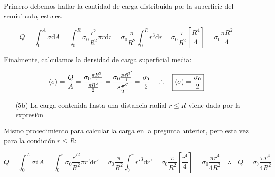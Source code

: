 \documentclass[a4paper,10pt]{article}
\begin{document}
Primero debemos hallar la cantidad de carga distribuida por la superficie del
semic\'irculo, esto es:

\begin{equation*}
    Q=\int_{0}^{A}\sigma\mathrm{d}A=\int_{0}^{R}\sigma_{0}\frac{r^2}{R^2}\pi r\mathrm{d}r
    =\sigma_{0}\frac{\pi}{R^{2}}\int_{0}^{R}r^{3}\mathrm{d}r
    =\sigma_{0}\frac{\pi}{R^{2}}\left[\frac{R^{4}}{4}\right]
    =\sigma_{0}\frac{\pi R^{2}}{4}
\end{equation*}

Finalmente, calculamos la densidad de carga superficial media:

\begin{equation*}
    \langle\sigma\rangle=\frac{Q}{A}
    =\frac{\sigma_{0}\frac{\pi R^{2}}{4}}{\frac{\pi R^{2}}{2}}
    =\frac{\sigma_{0}\frac{\cancel{\pi R^{2}}}{4}}{\frac{\cancel{\pi R^{2}}}{2}}
    =\frac{\sigma_{0}}{2}
    \quad\therefore\quad\boxed{\langle\sigma\rangle=\frac{\sigma_{0}}{2}}
\end{equation*}

\begin{itemize}
    \item[(5b)] La carga contenida hasta una distancia radial $r \leq R$ viene dada por la expresión
\end{itemize}

Mismo procedimiento para calcular la carga en la pregunta anterior, pero esta
vez para la condici\'on $r \leq R$:

\begin{equation*}
    Q=\int_{0}^{A}\sigma\mathrm{d}A=\int_{0}^{r}\sigma_{0}\frac{r'^2}{R^2}\pi r'\mathrm{d}r'
    =\sigma_{0}\frac{\pi}{R^{2}}\int_{0}^{r}r'^{3}\mathrm{d}r'
    =\sigma_{0}\frac{\pi}{R^{2}}\left[\frac{r^{4}}{4}\right]
    =\sigma_{0}\frac{\pi r^{4}}{4R^{2}}
    \quad\therefore\quad\boxed{Q=\sigma_{0}\frac{\pi r^{4}}{4R^{2}}}
\end{equation*}
\end{document}
